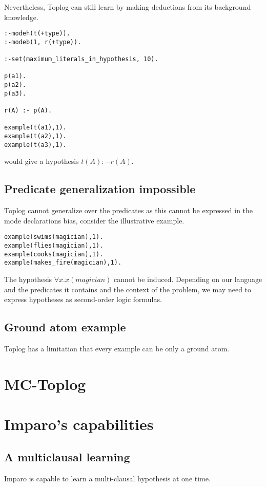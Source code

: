 Nevertheless, Toplog can still learn by making deductions from its background knowledge.

\begin{lstlisting}
:-modeh(t(+type)).
:-modeb(1, r(+type)).

:-set(maximum_literals_in_hypothesis, 10).

p(a1).
p(a2).
p(a3).

r(A) :- p(A).

example(t(a1),1).
example(t(a2),1).
example(t(a3),1).
\end{lstlisting}
would give a hypothesis $t(A) :- r(A).$

\subsection{Predicate generalization impossible}
Toplog cannot generalize over the predicates as this cannot be expressed in the mode declarations bias, consider the illustrative example.
\begin{lstlisting}
example(swims(magician),1).
example(flies(magician),1).
example(cooks(magician),1).
example(makes_fire(magician),1).
\end{lstlisting}
The hypothesis $\forall x. x(magician)$ cannot be induced. Depending on our language and the predicates it contains and the context of the problem, we may need to express hypotheses as second-order logic formulas.

\subsection{Ground atom example}
Toplog has a limitation that every example can be only a ground atom.

\section{MC-Toplog}

\section{Imparo's capabilities}
\subsection{A multiclausal learning}
Imparo is capable to learn a multi-clausal hypothesis at one time.

